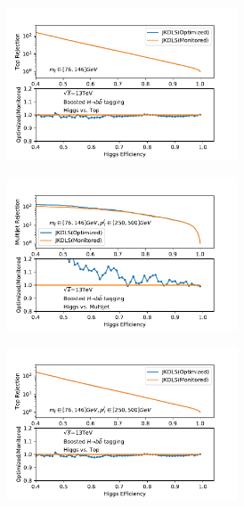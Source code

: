 \begin{figure}[htbp]
\begin{subfigure}{.5\textwidth}
    \caption{}
   \label{fig:}
  \end{subfigure}
  \begin{subfigure}{.5\textwidth}
  \centering
   \includegraphics[width=0.75\textwidth]{figuresXbb/OPT/OPTopMASS.pdf}
    \caption{}
   \label{fig:}
  \end{subfigure}
 \newline 
   \begin{subfigure}{.5\textwidth}
  \centering
   \includegraphics[width=0.75\textwidth]{figuresXbb/OPT/OPTQCDMASSPT1.pdf}
    \caption{}
   \label{fig:}
  \end{subfigure}
  \begin{subfigure}{.5\textwidth}
  \centering
   \includegraphics[width=0.75\textwidth]{figuresXbb/OPT/OPTopMASSPT1.pdf}

\end{subfigure}
\end{figure}
